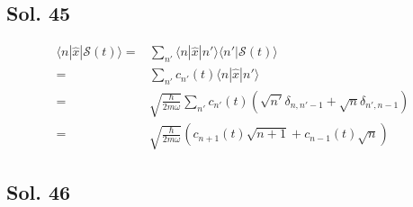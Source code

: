 \subsection*{Sol. 45}
\begin{align*}
    \langle n|\hat{x}|\mathcal{S}(t)\rangle =& 
    \sum_{n'}\langle n|\hat{x}|n'\rangle\langle n'|\mathcal{S}(t)\rangle \\
    =& 
    \sum_{n'}c_{n'}(t)\langle n|\hat{x}|n'\rangle\\
    =&\sqrt{\frac{\hbar}{2m\omega}}
    \sum_{n'}
    c_{n'}(t)
    (\sqrt{n'}\delta_{n,n'-1}
    +\sqrt{n}\delta_{n',n-1}
    )\\
    =&
    \sqrt{\frac{\hbar}{2m\omega}}
    (c_{n+1}(t)\sqrt{n+1}
    +
    c_{n-1}(t)\sqrt{n}
    )
\end{align*}
\subsection*{Sol. 46}


